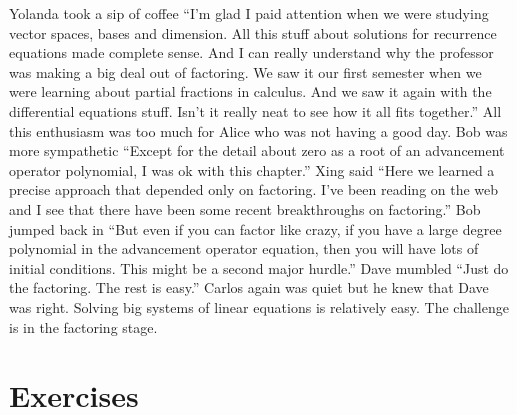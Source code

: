 Yolanda took a sip of coffee ``I'm glad I paid attention
when we were studying vector spaces, bases and dimension.
All this stuff about solutions for recurrence equations
made complete sense.   And I can really understand why
the professor was making a big deal out of factoring.
We saw it our first semester when we were learning about
partial fractions in calculus.  And we saw it again with the differential
equations stuff.  Isn't it really neat to see how it all
fits together.''  All this enthusiasm was too much for Alice who 
was not having a good day.  Bob was more sympathetic ``Except for
the detail about zero as a root of an advancement operator
polynomial, I was ok with this chapter.'' Xing said ``Here
we learned a precise approach that depended only on factoring.
I've been reading on the web and I see that there have
been some recent breakthroughs on factoring.''  Bob jumped
back in ``But even if you can factor like crazy, if you
have a large degree polynomial in the advancement operator
equation, then you will have lots of initial conditions.
This might be a second major hurdle.'' Dave mumbled ``Just
do the factoring. The rest is easy.''  Carlos again was
quiet but he knew that Dave was right.  Solving big
systems of linear equations is relatively easy. The
challenge is in the factoring stage.

\section{Exercises}

